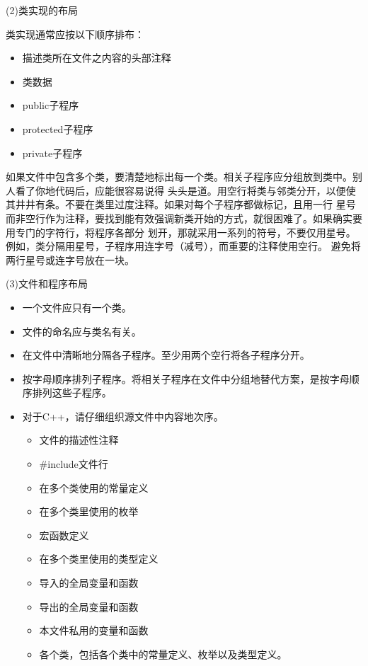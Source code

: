 \documentclass{article}
\begin{document}
\par
(2)类实现的布局
\par
类实现通常应按以下顺序排布：
\begin{itemize}
    \item 描述类所在文件之内容的头部注释
    \item 类数据
    \item public子程序
    \item protected子程序
    \item private子程序
\end{itemize}
如果文件中包含多个类，要清楚地标出每一个类。相关子程序应分组放到类中。别人看了你地代码后，应能很容易说得
头头是道。用空行将类与邻类分开，以便使其井井有条。不要在类里过度注释。如果对每个子程序都做标记，且用一行
星号而非空行作为注释，要找到能有效强调新类开始的方式，就很困难了。如果确实要用专门的字符行，将程序各部分
划开，那就采用一系列的符号，不要仅用星号。例如，类分隔用星号，子程序用连字号（减号），而重要的注释使用空行。
避免将两行星号或连字号放在一块。

\par
(3)文件和程序布局
\par
\begin{itemize}
    \item 一个文件应只有一个类。
    \item 文件的命名应与类名有关。
    \item 在文件中清晰地分隔各子程序。至少用两个空行将各子程序分开。
    \item 按字母顺序排列子程序。将相关子程序在文件中分组地替代方案，是按字母顺序排列这些子程序。
    \item 对于C++，请仔细组织源文件中内容地次序。
    \begin{itemize}
        \item 文件的描述性注释
        \item \#include文件行
        \item 在多个类使用的常量定义
        \item 在多个类里使用的枚举
        \item 宏函数定义
        \item 在多个类里使用的类型定义
        \item 导入的全局变量和函数
        \item 导出的全局变量和函数
        \item 本文件私用的变量和函数
        \item 各个类，包括各个类中的常量定义、枚举以及类型定义。
    \end{itemize}
\end{itemize}
\end{document}
